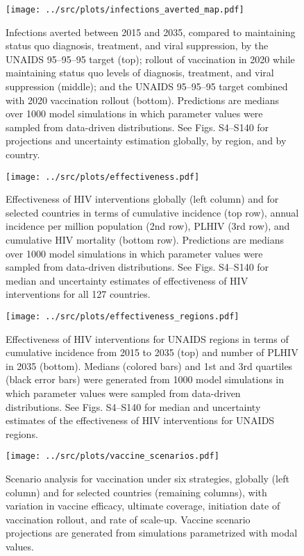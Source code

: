 \documentclass{article}
\begin{document}
\begin{figure}
  \centering
  \texttt{[image: ../src/plots/infections\_averted\_map.pdf]}
  \caption{Infections averted between 2015 and 2035, compared to
    maintaining status quo diagnosis, treatment, and viral
    suppression, by the UNAIDS 95–95–95 target (top); rollout of
    vaccination in 2020 while maintaining status quo levels of
    diagnosis, treatment, and viral suppression (middle); and the
    UNAIDS 95–95–95 target combined with 2020 vaccination rollout
    (bottom). Predictions are medians over 1000 model simulations in
    which parameter values were sampled from data-driven
    distributions. See Figs. S4–S140 for projections and uncertainty
    estimation globally, by region, and by country.}
\end{figure}


\begin{figure}
  \centering
  \texttt{[image: ../src/plots/effectiveness.pdf]}
  \caption{Effectiveness of HIV interventions globally (left column)
    and for selected countries in terms of cumulative incidence (top
    row), annual incidence per million population (2nd row), PLHIV
    (3rd row), and cumulative HIV mortality (bottom row). Predictions
    are medians over 1000 model simulations in which parameter values
    were sampled from data-driven distributions. See Figs. S4–S140 for
    median and uncertainty estimates of effectiveness of HIV
    interventions for all 127 countries.}
\end{figure}


\begin{figure}
  \centering
  \texttt{[image: ../src/plots/effectiveness\_regions.pdf]}
  \caption{Effectiveness of HIV interventions for UNAIDS regions in
    terms of cumulative incidence from 2015 to 2035 (top) and number
    of PLHIV in 2035 (bottom). Medians (colored bars) and 1st and 3rd
    quartiles (black error bars) were generated from 1000 model
    simulations in which parameter values were sampled from
    data-driven distributions. See Figs. S4–S140 for median and
    uncertainty estimates of the effectiveness of HIV interventions
    for UNAIDS regions.}
\end{figure}


\begin{figure}
  \centering
  \texttt{[image: ../src/plots/vaccine\_scenarios.pdf]}
  \caption{Scenario analysis for vaccination under six strategies,
    globally (left column) and for selected countries (remaining
    columns), with variation in vaccine efficacy, ultimate coverage,
    initiation date of vaccination rollout, and rate of
    scale-up. Vaccine scenario projections are generated from
    simulations parametrized with modal values.}
\end{figure}
\end{document}
